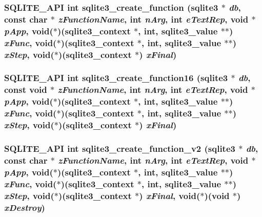 \subsubsection{\setlength{\rightskip}{0pt plus 5cm}SQLITE\_\-API int sqlite3\_\-create\_\-function (\bf{sqlite3} $\ast$ {\em db}, const char $\ast$ {\em z\-Function\-Name}, int {\em n\-Arg}, int {\em e\-Text\-Rep}, void $\ast$ {\em p\-App}, void($\ast$)(\bf{sqlite3\_\-context} $\ast$, int, \bf{sqlite3\_\-value} $\ast$$\ast$) {\em x\-Func}, void($\ast$)(\bf{sqlite3\_\-context} $\ast$, int, \bf{sqlite3\_\-value} $\ast$$\ast$) {\em x\-Step}, void($\ast$)(\bf{sqlite3\_\-context} $\ast$) {\em x\-Final})}\label{3_87_83_2sqlite3_8h_f070a60371f4332d24e7be7b7f2097b7}


\subsubsection{\setlength{\rightskip}{0pt plus 5cm}SQLITE\_\-API int sqlite3\_\-create\_\-function16 (\bf{sqlite3} $\ast$ {\em db}, const void $\ast$ {\em z\-Function\-Name}, int {\em n\-Arg}, int {\em e\-Text\-Rep}, void $\ast$ {\em p\-App}, void($\ast$)(\bf{sqlite3\_\-context} $\ast$, int, \bf{sqlite3\_\-value} $\ast$$\ast$) {\em x\-Func}, void($\ast$)(\bf{sqlite3\_\-context} $\ast$, int, \bf{sqlite3\_\-value} $\ast$$\ast$) {\em x\-Step}, void($\ast$)(\bf{sqlite3\_\-context} $\ast$) {\em x\-Final})}\label{3_87_83_2sqlite3_8h_5d852d74f7a67d560e44564aaf75c6b3}


\subsubsection{\setlength{\rightskip}{0pt plus 5cm}SQLITE\_\-API int sqlite3\_\-create\_\-function\_\-v2 (\bf{sqlite3} $\ast$ {\em db}, const char $\ast$ {\em z\-Function\-Name}, int {\em n\-Arg}, int {\em e\-Text\-Rep}, void $\ast$ {\em p\-App}, void($\ast$)(\bf{sqlite3\_\-context} $\ast$, int, \bf{sqlite3\_\-value} $\ast$$\ast$) {\em x\-Func}, void($\ast$)(\bf{sqlite3\_\-context} $\ast$, int, \bf{sqlite3\_\-value} $\ast$$\ast$) {\em x\-Step}, void($\ast$)(\bf{sqlite3\_\-context} $\ast$) {\em x\-Final}, void($\ast$)(void $\ast$) {\em x\-Destroy})}\label{3_87_83_2sqlite3_8h_14dd082584947d02a37f0509d7049aa3}



